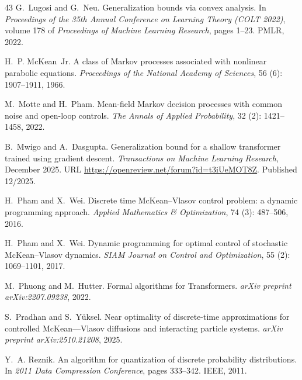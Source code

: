\documentclass[11pt]{article}
\begin{document}
\begin{thebibliography}{43}
G.~Lugosi and G.~Neu.
\newblock Generalization bounds via convex analysis.
\newblock In \emph{Proceedings of the 35th Annual Conference on Learning Theory (COLT 2022)}, volume 178 of \emph{Proceedings of Machine Learning Research}, pages 1--23. PMLR, 2022.

H.~P. McKean~Jr.
\newblock A class of {M}arkov processes associated with nonlinear parabolic equations.
\newblock \emph{Proceedings of the National Academy of Sciences}, 56 (6): 1907--1911, 1966.

M.~Motte and H.~Pham.
\newblock Mean-field {Markov} decision processes with common noise and open-loop controls.
\newblock \emph{The Annals of Applied Probability}, 32 (2): 1421--1458, 2022.

B.~Mwigo and A.~Dasgupta.
\newblock Generalization bound for a shallow transformer trained using gradient descent.
\newblock \emph{Transactions on Machine Learning Research}, December 2025.
\newblock URL \url{https://openreview.net/forum?id=t3iUeMOT8Z}.
\newblock Published 12/2025.

H.~Pham and X.~Wei.
\newblock Discrete time {McKean--Vlasov} control problem: a dynamic programming approach.
\newblock \emph{Applied Mathematics \& Optimization}, 74 (3): 487--506, 2016.

H.~Pham and X.~Wei.
\newblock Dynamic programming for optimal control of stochastic {McKean--Vlasov} dynamics.
\newblock \emph{SIAM Journal on Control and Optimization}, 55 (2): 1069--1101, 2017.

M.~Phuong and M.~Hutter.
\newblock Formal algorithms for {T}ransformers.
\newblock \emph{arXiv preprint arXiv:2207.09238}, 2022.

S.~Pradhan and S.~Y\"uksel.
\newblock Near optimality of discrete-time approximations for controlled {McKean---Vlasov} diffusions and interacting particle systems.
\newblock \emph{arXiv preprint arXiv:2510.21208}, 2025.

Y.~A. Reznik.
\newblock An algorithm for quantization of discrete probability distributions.
\newblock In \emph{2011 Data Compression Conference}, pages 333--342. IEEE, 2011.


\end{thebibliography}
\end{document}
